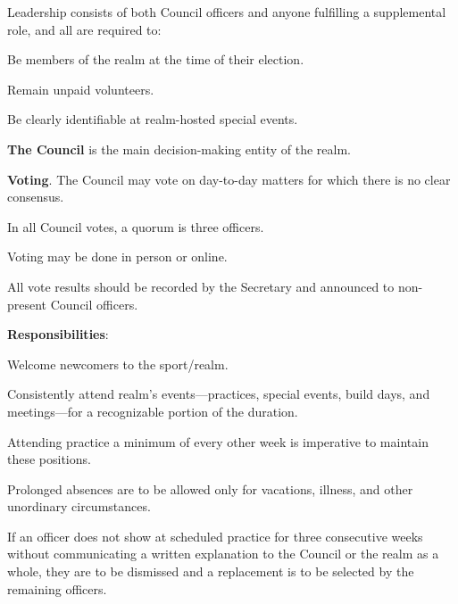 \documentclass[12pt]{article}
\begin{document}
\begin{level}
    \item Leadership consists of both Council officers and anyone fulfilling a supplemental role, and all are required to:
    \begin{level}
        \item Be members of the realm at the time of their election.
        \item Remain unpaid volunteers.
        \item Be clearly identifiable at realm-hosted special events.
    \end{level}
    \item \textbf{The Council} is the main decision-making entity of the realm. 
        \begin{level}
            \item \textbf{Voting}. The Council may vote on day-to-day matters for which there is no clear consensus.
            \begin{level}
                \item In all Council votes, a quorum is three officers. 
                \item Voting may be done in person or online.
                \item All vote results should be recorded by the Secretary and announced to non-present Council officers. 
            \end{level}
            \item \textbf{Responsibilities}:
            \begin{level}
                \item Welcome newcomers to the sport/realm.
                \item Consistently attend realm's events---practices, special events, build days, and meetings---for a recognizable portion of the duration. 
                \begin{level}
                    \item Attending practice a minimum of every other week is imperative to maintain these positions. 
                    \item Prolonged absences are to be allowed only for vacations, illness, and other unordinary circumstances. 
                    \item If an officer does not show at scheduled practice for three consecutive weeks without communicating a written explanation to the Council or the realm as a whole, they are to be dismissed and a replacement is to be selected by the remaining officers. 

\end{level}
\end{level}
\end{level}
\end{level}
\end{document}
